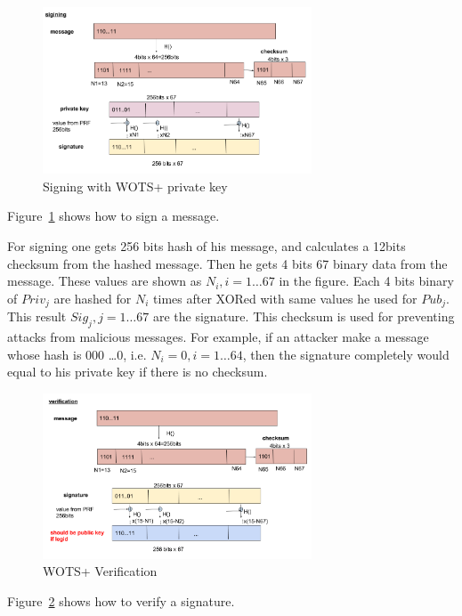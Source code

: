 \documentclass[a4paper,10pt,twocolumn]{article}
\begin{document}
 \begin{figure}[ht]
	\begin{center}
	\includegraphics[width=80mm]{wots_sign.png}
	  \caption{Signing with WOTS+ private key}
    \label{fig:wots_sign}
	\end{center}
 \end{figure}

 Figure~\ref{fig:wots_sign} shows  how to sign a message.

 For signing one gets 256 bits hash of his message, and calculates a 12bits checksum from the hashed message.
 Then he gets 4 bits 67 binary data from the message.
 These values are shown as \(N_i,i=1 \ldots 67\) in the figure. Each 4 bits binary of \( Priv_j \) are hashed for
 \(N_i\)  times after XORed with same values he used for \( Pub_{j} \). 
 This result \( Sig_j, j=1 \ldots 67 \) are the signature.
 This checksum is used for preventing attacks from malicious messages. For example, if an attacker make a message  whose hash is 000 \ldots 0,
 i.e. \( N_i = 0, i=1 \ldots 64 \), then the signature completely would equal to his private key if there is no checksum. 

 \begin{figure}[ht]
	\begin{center}
	\includegraphics[width=80mm]{wots_veri.png}
	  \caption{WOTS+ Verification }
    \label{fig:wots_veri}
	\end{center}
 \end{figure}

 Figure~\ref{fig:wots_veri} shows  how to verify a signature.
\end{document}
